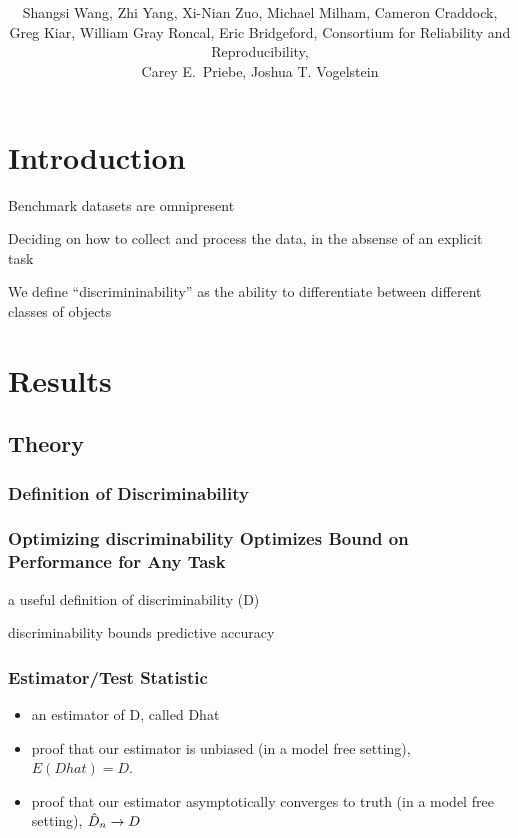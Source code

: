 \documentclass{article}
\title{\vspace{-50pt}
\db{Optimal Design for Discovery Science via Maximizing Discriminability: \\ Applications in Neuroimaging}
}
\author{Shangsi Wang, Zhi Yang, Xi-Nian Zuo, Michael Milham, Cameron Craddock,  \\ 
Greg Kiar, William Gray Roncal, Eric Bridgeford,
Consortium for Reliability and Reproducibility, \\ Carey E.~Priebe, Joshua T. Vogelstein}
\begin{document}
\maketitle
\tableofcontents
\newpage

\section{Introduction}

 Benchmark datasets are omnipresent

 Deciding on how to collect and process the data, in the absense of an explicit task

 We define ``discrimininability'' as the ability to differentiate between different classes of objects



\section{Results}



\subsection{Theory}

\subsubsection{Definition of Discriminability}

\subsubsection{Optimizing discriminability Optimizes Bound on Performance for Any Task}


a useful definition of discriminability (D)

\begin{thm}
discriminability bounds predictive accuracy
\end{thm}


\subsubsection{Estimator/Test Statistic}

\begin{itemize}
\item an estimator of D, called Dhat

\item proof that our estimator is unbiased (in a model free setting), 
$E(Dhat)=D$.

\item proof that our estimator asymptotically converges to truth (in a model free setting), $\hat{D}_n \rightarrow D$
\end{itemize}
\end{document}
